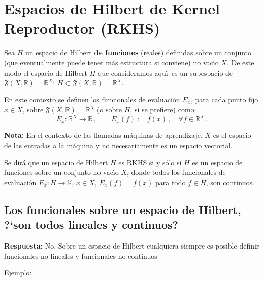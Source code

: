 
\section{Espacios de Hilbert de Kernel Reproductor (RKHS)}



Sea $H$ un espacio de Hilbert {\bf de funciones} (reales) definidas sobre
un conjunto (que eventualmente puede tener m\'as estructura si conviene)
no vac\'\i o $X$.
De este modo el espacio de Hilbert $H$ que consideramos aqu\'\i\
es un subespacio de $\mathfrak{F}(X,\mathbb{R})=\mathbb{R}^X$:
$H\subset\mathfrak{F}(X,\mathbb{R})=\mathbb{R}^X$.

\begin{mydef}
En este contexto se definen los funcionales de evaluaci\'on $E_x$,
para cada punto fijo $x\in X$, sobre
$\mathfrak{F}(X,\mathbb{R})=\mathbb{R}^X$
(o sobre $H$, si se prefiere) como:
$$
E_x: \mathbb{R}^X\to\mathbb{R}\,,\qquad
E_x(f):=f(x)\,,\quad\forall f\in \mathbb{R}^X\,.
$$
\end{mydef}

\textbf{Nota:} En el contexto de las llamadas m\'aquinas de aprendizaje, $X$ es
el espacio de las entradas a la m\'aquina y no necesariamente es un espacio
vectorial.

\begin{mydef}
Se dir\'a que un espacio de Hilbert $H$ es RKHS si y s\'olo si
$H$ es un espacio de funciones sobre un conjunto no vac\'\i o $X$, donde
todos los funcionales de evaluaci\'on $E_x:H\to\mathbb{K}$, $x\in X$, 
$E_x(f)=f(x)$ para todo $f\in H$, son continuos.
\end{mydef}

\subsection*{Los funcionales sobre un espacio de Hilbert, ?`son todos lineales y continuos?}


\textbf{Respuesta:} No. Sobre un espacio de Hilbert cualquiera siempre es posible definir funcionales no-lineales y funcionales no continuos


Ejemplo:

